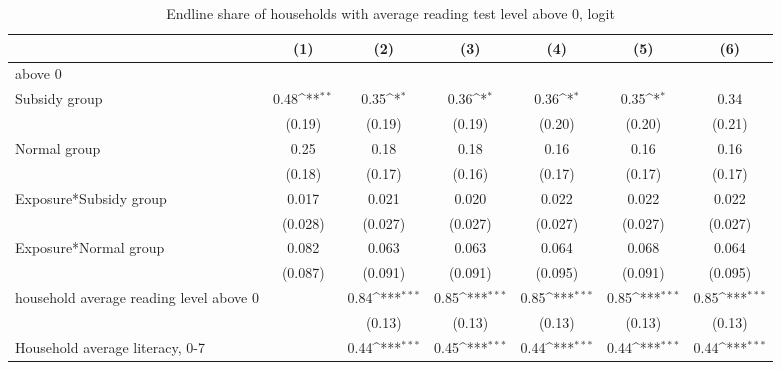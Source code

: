 \begin{table}[htbp]\centering
\def\sym#1{\ifmmode^{#1}\else\(^{#1}\)\fi}
\caption{Endline share of households with average reading test level above 0, logit}
\begin{tabular*}{1\hsize}{@{\hskip\tabcolsep\extracolsep\fill}l*{6}{c}}
\toprule
                &\multicolumn{1}{c}{(1)}         &\multicolumn{1}{c}{(2)}         &\multicolumn{1}{c}{(3)}         &\multicolumn{1}{c}{(4)}         &\multicolumn{1}{c}{(5)}         &\multicolumn{1}{c}{(6)}         \\
\midrule
above 0         &                  &                  &                  &                  &                  &                  \\
Subsidy group   &     0.48\sym{**} &     0.35\sym{*}  &     0.36\sym{*}  &     0.36\sym{*}  &     0.35\sym{*}  &     0.34         \\
                &   (0.19)         &   (0.19)         &   (0.19)         &   (0.20)         &   (0.20)         &   (0.21)         \\
Normal group    &     0.25         &     0.18         &     0.18         &     0.16         &     0.16         &     0.16         \\
                &   (0.18)         &   (0.17)         &   (0.16)         &   (0.17)         &   (0.17)         &   (0.17)         \\
Exposure*Subsidy group&    0.017         &    0.021         &    0.020         &    0.022         &    0.022         &    0.022         \\
                &  (0.028)         &  (0.027)         &  (0.027)         &  (0.027)         &  (0.027)         &  (0.027)         \\
Exposure*Normal group&    0.082         &    0.063         &    0.063         &    0.064         &    0.068         &    0.064         \\
                &  (0.087)         &  (0.091)         &  (0.091)         &  (0.095)         &  (0.091)         &  (0.095)         \\
household average reading level above 0&                  &     0.84\sym{***}&     0.85\sym{***}&     0.85\sym{***}&     0.85\sym{***}&     0.85\sym{***}\\
                &                  &   (0.13)         &   (0.13)         &   (0.13)         &   (0.13)         &   (0.13)         \\
Household average literacy, 0-7&                  &     0.44\sym{***}&     0.45\sym{***}&     0.44\sym{***}&     0.44\sym{***}&     0.44\sym{***}\\

\end{tabular*}
\end{table}
